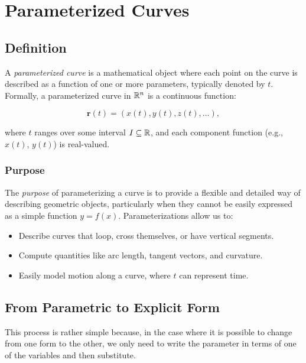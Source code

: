 \chapter{Parameterized Curves}

\section{Definition}

A \emph{parameterized curve} is a mathematical object where each point on the curve is described as a 
function of one or more parameters, typically denoted by \(t\). Formally, a parameterized curve in 
\( \mathbb{R}^n \) is a continuous function:

\[
    \mathbf{r}(t) = (x(t), y(t), z(t), \ldots),
\]

where \(t\) ranges over some interval \( I \subseteq \mathbb{R} \), and each component function 
(e.g., \( x(t) \), \( y(t) \)) is real-valued.

\subsection{Purpose}

The \emph{purpose} of parameterizing a curve is to provide a flexible and detailed way of describing geometric 
objects, particularly when they cannot be easily expressed as a simple function \( y = f(x) \). 
Parameterizations allow us to:

\begin{itemize}

    \item Describe curves that loop, cross themselves, or have vertical segments.

    \item Compute quantities like arc length, tangent vectors, and curvature.

    \item Easily model motion along a curve, where \(t\) can represent time.

\end{itemize}

\section{From Parametric to Explicit Form}

This process is rather simple because, in the case where it is possible to change from one form to the other, we only need to 
write the parameter in terms of one of the variables and then substitute.

